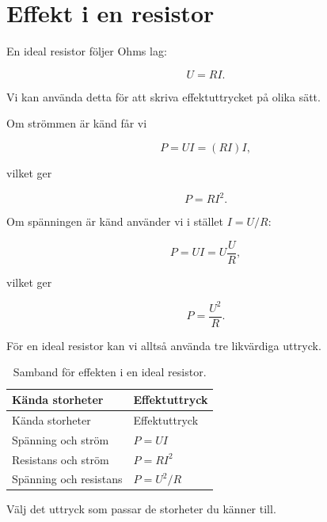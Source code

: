 \documentclass[
  swedish,
  11pt,
  a4paper,
  DIV=11,
  numbers=noendperiod,
  twoside,
  open=any]{scrreprt}
\begin{document}
\section{Effekt i en resistor}\label{sec-effekt-effekt-i-en-resistor}

En ideal resistor följer Ohms lag:

\[
U = RI.
\]

Vi kan använda detta för att skriva effektuttrycket på olika sätt.

Om strömmen är känd får vi

\[
P = UI = (RI)I,
\]

vilket ger

\[
\boxed{P = RI^2}.
\]

Om spänningen är känd använder vi i stället \(I = U/R\):

\[
P = UI = U\frac{U}{R},
\]

vilket ger

\[
\boxed{P = \frac{U^2}{R}}.
\]

För en ideal resistor kan vi alltså använda tre likvärdiga uttryck.

\begin{longtable}[]{@{}ll@{}}
\caption{Samband för effekten i en ideal
resistor.}\label{tbl-effekt-resistor}\tabularnewline
\toprule\noalign{}
Kända storheter & Effektuttryck \\
\midrule\noalign{}
\endfirsthead
\toprule\noalign{}
Kända storheter & Effektuttryck \\
\midrule\noalign{}
\endhead
\bottomrule\noalign{}
\endlastfoot
Spänning och ström & \(P = UI\) \\
Resistans och ström & \(P = RI^2\) \\
Spänning och resistans & \(P = U^2/R\) \\
\end{longtable}

Välj det uttryck som passar de storheter du känner till.
\end{document}

